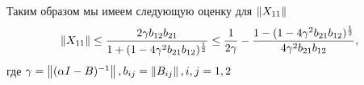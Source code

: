 Таким образом мы имеем следующую оценку для $\left\|X_{11}\right\|$
$$
	\left\|X_{11}\right\| \leq \frac{2\gamma b_{12}b_{21}}{1 + (1 - 4\gamma^2 b_{21}b_{12})^{\frac{1}{2}}} \leq \frac{1}{2\gamma} - \frac{1 - (1 - 4\gamma^2 b_{21}b_{12})^{\frac{1}{2}}}{4\gamma^2 b_{21}b_{12}},
$$
где $\gamma = \left\|(\alpha I - B)^{-1}\right\|, b_{ij} = \left\|B_{ij}\right\|, i,j=1,2$ 



